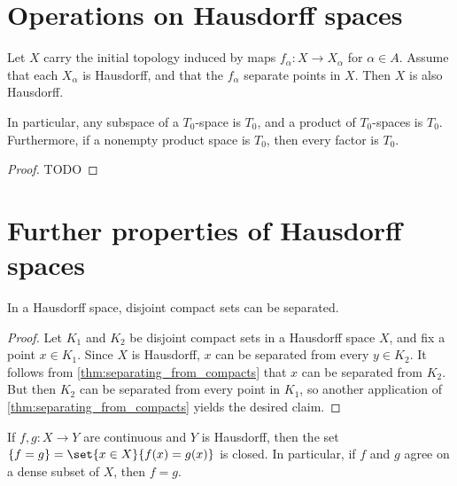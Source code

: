 \documentclass[article, a4paper, 11pt, oneside]{memoir}
\numberwithin{equation}{chapter}
\begin{document}
\section{Operations on Hausdorff spaces}

\begin{proposition} %
    Let $X$ carry the initial topology induced by maps $f_\alpha \colon X \to X_\alpha$ for $\alpha \in A$. Assume that each $X_\alpha$ is Hausdorff, and that the $f_\alpha$ separate points in $X$. Then $X$ is also Hausdorff.

    In particular, any subspace of a $T_0$-space is $T_0$, and a product of $T_0$-spaces is $T_0$. Furthermore, if a nonempty product space is $T_0$, then every factor is $T_0$.
\end{proposition}

\begin{proof}
    TODO
\end{proof}


\section{Further properties of Hausdorff spaces}

\begin{proposition}
    \label{thm:Hausdorff-separate-compacts}
    In a Hausdorff space, disjoint compact sets can be separated.
\end{proposition}

\begin{proof}
    Let $K_1$ and $K_2$ be disjoint compact sets in a Hausdorff space $X$, and fix a point $x \in K_1$. Since $X$ is Hausdorff, $x$ can be separated from every $y \in K_2$. It follows from \cref{thm:separating_from_compacts} that $x$ can be separated from $K_2$. But then $K_2$ can be separated from every point in $K_1$, so another application of \cref{thm:separating_from_compacts} yields the desired claim.
\end{proof}


\begin{proposition}
    If $f,g \colon X \to Y$ are continuous and $Y$ is Hausdorff, then the set $\{f = g\} = \set{x \in X}{f(x) = g(x)}$ is closed. In particular, if $f$ and $g$ agree on a dense subset of $X$, then $f = g$.
\end{proposition}
\end{document}

